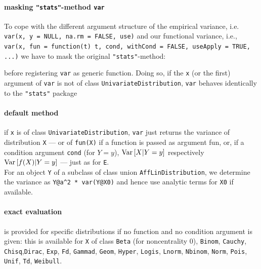 \documentclass[11pt]{article}
\newcommand{\code}[1]{{\tt #1}}
\newcommand{\pkg}[1]{{\tt "#1"}}
\begin{document}
\paragraph{masking \pkg{stats}-method \code{var}}
To cope with the different argument structure of the empirical variance,
i.e. \code{var(x, y = NULL, na.rm = FALSE, use)}  and our functional variance,
i.e.,
\code{var(x, fun = function(t) {t}, cond, withCond = FALSE, useApply = TRUE, ...)}
we have to mask the original \pkg{stats}-method:
\begin{Schunk}
\end{Schunk}
before registering \code{var} as generic function.
Doing so, if the \code{x} (or the first) argument of \code{var}
is not of class \code{UnivariateDistribution}, \code{var} behaves identically to
the \pkg{stats} package
\paragraph{default method} if \code{x} is of class \code{UnivariateDistribution},
\code{var} just returns the variance of distribution \code{X} --- or
of \code{fun(X)} if a function is passed as argument fun, or, if a condition
argument \code{cond} (for $Y=y$),  ${\rm Var}\,[X|Y=y]$ respectively
${\rm Var}\,[f(X)|Y=y]$ --- just as for \code{E}. \\
For an object \code{Y} of a subclass of class
union \code{AffLinDistribution}, we determine the variance as
\code{Y@a\textasciicircum2 * var(Y@X0)} and hence use analytic terms for \code{X0} if
available.
\paragraph{exact evaluation} is provided for specific distributions if no
function and no condition argument is given:
this is available for \code{X} of class \code{Beta} (for noncentrality $0$),
\code{Binom}, \code{Cauchy}, \code{Chisq},\code{Dirac}, \code{Exp}, \code{Fd},
\code{Gammad}, \code{Geom}, \code{Hyper}, \code{Logis}, \code{Lnorm},
\code{Nbinom}, \code{Norm}, \code{Pois}, \code{Unif}, \code{Td}, \code{Weibull}.
\end{document}
